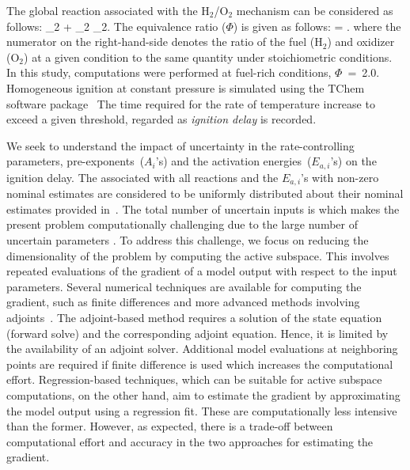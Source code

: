 %
The global reaction associated with the H$_2$/O$_2$ mechanism can
be considered as follows:
_2 + _2 _2.
\label{eq:global}
\ee 
The equivalence ratio ($\Phi$) is given as follows:
%
\be
\Phi = .
\label{eq:phi}
\ee
%
where the numerator on the right-hand-side denotes the ratio of the fuel (H$_2$)
and oxidizer (O$_2$) at a given condition to the same quantity under stoichiometric
conditions. In this study, computations were performed at fuel-rich conditions,
$\Phi$~=~2.0. Homogeneous ignition at constant pressure is simulated using the
TChem software package~\cite{Safta:2011}  The time required for the rate of
temperature increase to exceed a given threshold, regarded as \emph{ignition delay}
is recorded. 

We seek to understand the impact of uncertainty in the
rate-controlling parameters, pre-exponents~($A_i$'s) 
and the activation energies~($E_{a,i}$'s) 
 on the ignition delay. The  associated with all
reactions and the $E_{a,i}$'s with non-zero nominal estimates
are considered to be uniformly distributed about their nominal estimates provided
in~\cite{Yetter:1991}.  
The total number of uncertain inputs is  which makes
the present problem computationally challenging due to the large number of 
uncertain parameters .  
To address this challenge, we focus on reducing the dimensionality
of the problem by computing the active subspace.
This involves repeated evaluations of the gradient of a model output with
respect to the input parameters. Several numerical techniques are available
for computing the gradient, such as 
finite differences and more advanced methods involving
adjoints~\cite{Jameson:1988,Borzi:2011,Alexanderian:2017}. The
adjoint-based method requires a solution of the state equation (forward solve)
and the corresponding adjoint equation. Hence, it is 
limited by the availability of an adjoint solver. Additional model evaluations
at neighboring points are required if finite difference is used which increases
the computational effort. 
Regression-based techniques, which can be suitable for active subspace computations,
on the other hand, aim to estimate the gradient by approximating the model
output using a regression fit.  
These are computationally less intensive than
the former. However, as expected, there is a trade-off between computational
effort and accuracy in the two approaches for estimating the gradient. 

